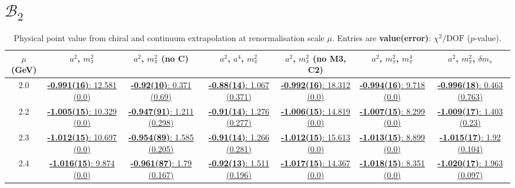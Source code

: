 \documentclass[12pt]{extarticle}
\begin{document}
\section{$\mathcal{B}_2$}
\begin{table}[h!]
\begin{center}
\begin{tabular}{|c|c|c|c|c|c|c|}
\hline
$\mu$ (GeV) & $a^2$, $m_\pi^2$& $a^2$, $m_\pi^2$ (no C)& $a^2$, $a^4$, $m_\pi^2$& $a^2$, $m_\pi^2$ (no M3, C2)& $a^2$, $m_\pi^2$, $m_\pi^4$& $a^2$, $m_\pi^2$, $\delta m_s$\\
\hline
2.0& \hyperlink{VVmAA/NPR/a2m2_20.pdf.1}{\textbf{-0.991(16)}: 12.581 (0.0)} & \hyperlink{VVmAA/NPR/a2m2noC_20.pdf.1}{\textbf{-0.92(10)}: 0.371 (0.69)} & \hyperlink{VVmAA/NPR/a2a4m2_20.pdf.1}{\textbf{-0.88(14)}: 1.067 (0.371)} & \hyperlink{VVmAA/NPR/a2m2mcut_20.pdf.1}{\textbf{-0.992(16)}: 18.312 (0.0)} & \hyperlink{VVmAA/NPR/a2m2m4_20.pdf.1}{\textbf{-0.994(16)}: 9.718 (0.0)} & \hyperlink{VVmAA/NPR/a2m2delm_20.pdf.1}{\textbf{-0.996(18)}: 0.463 (0.763)}\\
2.2& \hyperlink{VVmAA/NPR/a2m2_22.pdf.1}{\textbf{-1.005(15)}: 10.329 (0.0)} & \hyperlink{VVmAA/NPR/a2m2noC_22.pdf.1}{\textbf{-0.947(91)}: 1.211 (0.298)} & \hyperlink{VVmAA/NPR/a2a4m2_22.pdf.1}{\textbf{-0.91(14)}: 1.276 (0.277)} & \hyperlink{VVmAA/NPR/a2m2mcut_22.pdf.1}{\textbf{-1.006(15)}: 14.819 (0.0)} & \hyperlink{VVmAA/NPR/a2m2m4_22.pdf.1}{\textbf{-1.007(15)}: 8.299 (0.0)} & \hyperlink{VVmAA/NPR/a2m2delm_22.pdf.1}{\textbf{-1.009(17)}: 1.403 (0.23)}\\
2.3& \hyperlink{VVmAA/NPR/a2m2_23.pdf.1}{\textbf{-1.012(15)}: 10.697 (0.0)} & \hyperlink{VVmAA/NPR/a2m2noC_23.pdf.1}{\textbf{-0.954(89)}: 1.585 (0.205)} & \hyperlink{VVmAA/NPR/a2a4m2_23.pdf.1}{\textbf{-0.91(14)}: 1.266 (0.281)} & \hyperlink{VVmAA/NPR/a2m2mcut_23.pdf.1}{\textbf{-1.012(15)}: 15.613 (0.0)} & \hyperlink{VVmAA/NPR/a2m2m4_23.pdf.1}{\textbf{-1.013(15)}: 8.899 (0.0)} & \hyperlink{VVmAA/NPR/a2m2delm_23.pdf.1}{\textbf{-1.015(17)}: 1.92 (0.104)}\\
2.4& \hyperlink{VVmAA/NPR/a2m2_24.pdf.1}{\textbf{-1.016(15)}: 9.874 (0.0)} & \hyperlink{VVmAA/NPR/a2m2noC_24.pdf.1}{\textbf{-0.961(87)}: 1.79 (0.167)} & \hyperlink{VVmAA/NPR/a2a4m2_24.pdf.1}{\textbf{-0.92(13)}: 1.511 (0.196)} & \hyperlink{VVmAA/NPR/a2m2mcut_24.pdf.1}{\textbf{-1.017(15)}: 14.367 (0.0)} & \hyperlink{VVmAA/NPR/a2m2m4_24.pdf.1}{\textbf{-1.018(15)}: 8.351 (0.0)} & \hyperlink{VVmAA/NPR/a2m2delm_24.pdf.1}{\textbf{-1.020(17)}: 1.963 (0.097)}\\
\hline
\end{tabular}
\caption{Physical point value from chiral and continuum extrapolation at renormalisation scale $\mu$. Entries are \textbf{value(error)}: $\chi^2/\text{DOF}$ ($p$-value).}
\end{center}
\end{table}
\end{document}
